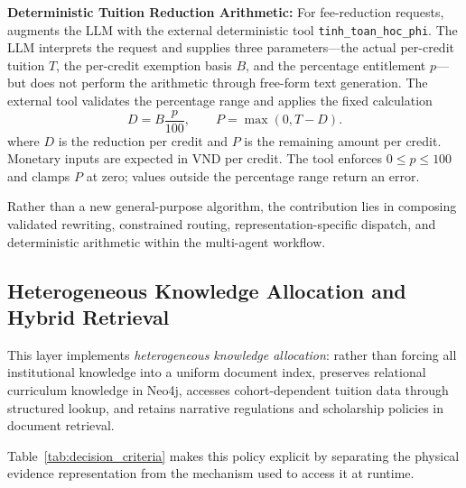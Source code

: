 \textbf{Deterministic Tuition Reduction Arithmetic:}
For fee-reduction requests, \system{} augments the LLM with the external deterministic tool \texttt{tinh\_toan\_hoc\_phi}. The LLM interprets the request and supplies three parameters---the actual per-credit tuition $T$, the per-credit exemption basis $B$, and the percentage entitlement $p$---but does not perform the arithmetic through free-form text generation. The external tool validates the percentage range and applies the fixed calculation
\begin{equation}
  D = B\frac{p}{100}, \qquad P = \max(0, T-D).
  \label{eq:tuition_reduction}
\end{equation}
where $D$ is the reduction per credit and $P$ is the remaining amount per credit. Monetary inputs are expected in VND per credit. The tool enforces $0 \le p \le 100$ and clamps $P$ at zero; values outside the percentage range return an error.

Rather than a new general-purpose algorithm, the contribution lies in composing validated rewriting, constrained routing, representation-specific dispatch, and deterministic arithmetic within the multi-agent workflow.

\subsection{Heterogeneous Knowledge Allocation and Hybrid Retrieval}
\label{sec:hybrid_retrieval}

This layer implements \emph{heterogeneous knowledge allocation}: rather than forcing all institutional knowledge into a uniform document index, \system{} preserves relational curriculum knowledge in Neo4j, accesses cohort-dependent tuition data through structured lookup, and retains narrative regulations and scholarship policies in document retrieval.

Table~\ref{tab:decision_criteria} makes this policy explicit by separating the physical evidence representation from the mechanism used to access it at runtime.

